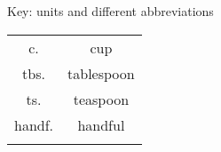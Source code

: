 \documentclass[12pt,a4paper]{article}
\begin{document}
	
	\begin{center}
		{\Large Key: units and different abbreviations }
	\end{center}

\begin{table}[H]
	\begin{tabular}{cc}
	c.	& cup                     \\
	tbs. & tablespoon                     \\
	ts.	& teaspoon                    \\
	handf. & handful \\
		\multicolumn{1}{l}{} & \multicolumn{1}{l}{}
	\end{tabular}
\end{table}
\end{document}
